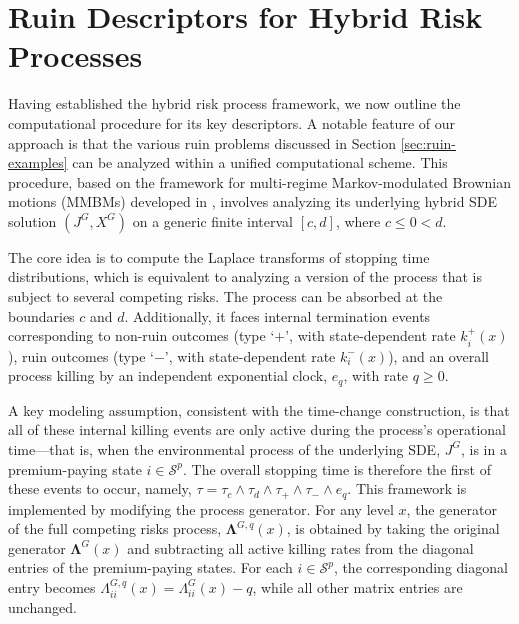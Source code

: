 \documentclass[11pt]{article}
\numberwithin{table}{section}
\numberwithin{figure}{section}
\numberwithin{equation}{section}
\newcommand{\1}{{\mathbf 1}}
\newcommand{\0}{\mat{0}}
\begin{document}
\section{Ruin Descriptors for Hybrid Risk Processes}\label{sec:ruin-hybrid}

Having established the hybrid risk process framework, we now outline the computational procedure for its key descriptors. A notable feature of our approach is that the various ruin problems discussed in Section \ref{sec:ruin-examples} can be analyzed within a unified computational scheme. This procedure, based on the framework for multi-regime Markov-modulated Brownian motions (MMBMs) developed in \cite{albrecher2022space}, involves analyzing { its underlying hybrid SDE solution $(J^G,X^G)$} on a generic finite interval $[c,d]$, where $c \le 0 < d$.

The core idea is to compute the Laplace transforms of stopping time distributions, which is equivalent to analyzing a version of the process that is subject to several competing risks. The process can be absorbed at the boundaries $c$ and $d$. Additionally, it faces internal termination events corresponding to non-ruin outcomes (type `$+$', with state-dependent rate $k_i^+(x)$), ruin outcomes (type `$-$', with state-dependent rate $k_i^-(x)$), and an overall process killing by an independent exponential clock, $e_q$, with rate $q \ge 0$.

A key modeling assumption, consistent with the time-change construction, is that all of these internal killing events are only active during the process's operational time—that is, when the environmental process { of the underlying SDE, $J^G$,} is in a premium-paying state $i \in \mathcal{S}^p$. The overall stopping time is therefore the first of these events to occur, namely, $\tau = \tau_c \wedge \tau_d \wedge \tau_+ \wedge \tau_- \wedge e_q$. This framework is implemented by modifying the process generator. For any level $x$, the generator of the full competing risks process, $\bm{\Lambda}^{G,q}(x)$, is obtained by taking the original generator $\bm{\Lambda}^G(x)$ and subtracting all active killing rates from the diagonal entries of the premium-paying states. For each $i \in \mathcal{S}^p$, the corresponding diagonal entry becomes $\Lambda^{G,q}_{ii}(x) = \Lambda^G_{ii}(x) - q$, while all other matrix entries are unchanged.
\end{document}
